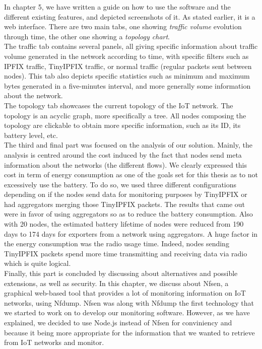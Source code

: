 In chapter 5, we have written a guide on how to use the software and the different existing features, and depicted screenshots of it. As stated earlier, it is a web interface. There are two main tabs, one showing \textit{traffic volume} evolution through time, the other one showing a \textit{topology chart}. \\

The traffic tab contains several panels, all giving specific information about traffic volume generated in the network according to time, with specific filters such as IPFIX traffic, TinyIPFIX traffic, or normal traffic (regular packets sent between nodes). This tab also depicts specific statistics such as minimum and maximum bytes generated in a five-minutes interval, and more generally some information about the network. \\

The topology tab showcases the current topology of the IoT network. The topology is an acyclic graph, more specifically a tree. All nodes composing the topology are clickable to obtain more specific information, such as its ID, its battery level, etc.\\

The third and final part was focused on the analysis of our solution. Mainly, the analysis is centred around the cost induced by the fact that nodes send meta information about the networks (the different flows). We clearly expressed this cost in term of energy consumption as one of the goals set for this thesis as to not excessively use the battery. To do so, we used three different configurations depending on if the nodes send data for monitoring purposes by TinyIPFIX or had aggregators merging those TinyIPFIX packets. The results that came out were in favor of using aggregators so as to reduce the battery consumption. Also with 20 nodes, the estimated battery lifetime of nodes were reduced from 190 days to 174 days for exporters from a network using aggregators. A huge factor in the energy consumption was the radio usage time. Indeed, nodes sending TinyIPFIX packets spend more time transmitting and receiving data via radio which is quite logical.\\

Finally, this part is concluded by discussing about alternatives and possible extensions, as well as security. In this chapter, we discuss about Nfsen, a graphical web-based tool that provides a lot of monitoring information on IoT networks, using Nfdump. Nfsen was along with Nfdump the first technology that we started to work on to develop our monitoring software. However, as we have explained, we decided to use Node.js instead of Nfsen for conviniency and because it being more appropriate for the information that we wanted to retrieve from IoT networks and monitor. \\

